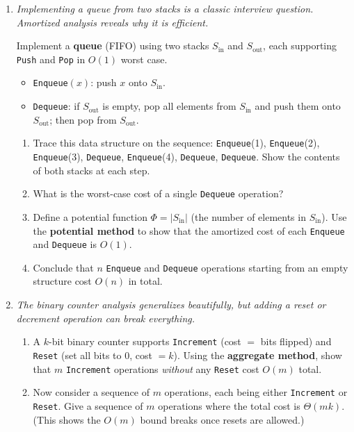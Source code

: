 \documentclass[9pt]{book}
\begin{document}
\begin{enumerate}[label=\arabic*.]
\item \textit{Implementing a queue from two stacks is a classic interview question. Amortized analysis reveals why it is efficient.}

Implement a \textbf{queue} (FIFO) using two stacks $S_{\text{in}}$ and $S_{\text{out}}$, each supporting \texttt{Push} and \texttt{Pop} in $O(1)$ worst case.
\begin{itemize}
    \item \texttt{Enqueue}$(x)$: push $x$ onto $S_{\text{in}}$.
    \item \texttt{Dequeue}: if $S_{\text{out}}$ is empty, pop all elements from $S_{\text{in}}$ and push them onto $S_{\text{out}}$; then pop from $S_{\text{out}}$.
\end{itemize}

\begin{enumerate}
    \item Trace this data structure on the sequence: \texttt{Enqueue}(1), \texttt{Enqueue}(2), \texttt{Enqueue}(3), \texttt{Dequeue}, \texttt{Enqueue}(4), \texttt{Dequeue}, \texttt{Dequeue}. Show the contents of both stacks at each step.
    \item What is the worst-case cost of a single \texttt{Dequeue} operation?
    \item Define a potential function $\Phi = |S_{\text{in}}|$ (the number of elements in $S_{\text{in}}$). Use the \textbf{potential method} to show that the amortized cost of each \texttt{Enqueue} and \texttt{Dequeue} is $O(1)$.
    \item Conclude that $n$ \texttt{Enqueue} and \texttt{Dequeue} operations starting from an empty structure cost $O(n)$ in total.
\end{enumerate}

\item \textit{The binary counter analysis generalizes beautifully, but adding a reset or decrement operation can break everything.}

\begin{enumerate}
    \item A $k$-bit binary counter supports \texttt{Increment} (cost $=$ bits flipped) and \texttt{Reset} (set all bits to 0, cost $= k$). Using the \textbf{aggregate method}, show that $m$ \texttt{Increment} operations \emph{without} any \texttt{Reset} cost $O(m)$ total.

    \item Now consider a sequence of $m$ operations, each being either \texttt{Increment} or \texttt{Reset}. Give a sequence of $m$ operations where the total cost is $\Theta(mk)$. (This shows the $O(m)$ bound breaks once resets are allowed.)


\end{enumerate}
\end{enumerate}
\end{document}
